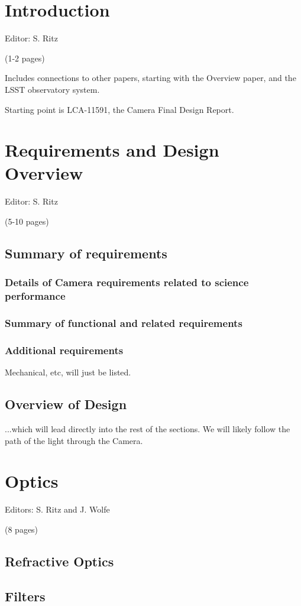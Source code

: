 \section{Introduction}
Editor: S. Ritz

(1-2 pages)

Includes connections to other papers, starting with the Overview paper, and the LSST observatory system.

Starting point is LCA-11591, the Camera Final Design Report.

\section{Requirements and Design Overview}
Editor: S. Ritz

(5-10 pages)

\subsection{Summary of requirements}
\subsubsection{Details of Camera requirements related to science performance}
\subsubsection{Summary of functional and related requirements}
\subsubsection{Additional requirements}
Mechanical, etc, will just be listed.
\subsection{Overview of Design}
...which will lead directly into the rest of the sections. We will likely follow the path of the light through the Camera.

\section{Optics}
Editors: S. Ritz and J. Wolfe

(8 pages)

\subsection{Refractive Optics}
\subsection{Filters}
